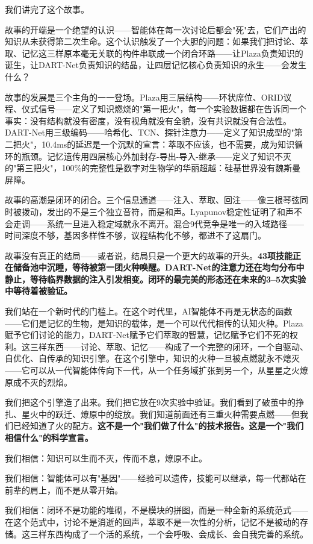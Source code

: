 \documentclass[twocolumn,10.5pt]{ctexart}
\begin{document}
我们讲完了这个故事。

故事的开端是一个绝望的认识——智能体在每一次讨论后都会"死"去，它们产出的知识从未获得第二次生命。这个认识触发了一个大胆的问题：如果我们把讨论、萃取、记忆这三样原本毫无关联的构件串联成一个闭合环路——让Plaza负责知识的诞生，让DART-Net负责知识的结晶，让四层记忆核心负责知识的永生——会发生什么？

故事的发展是三个主角的一一登场。Plaza用三层结构——环状席位、ORID议程、仪式信号——定义了知识燃烧的"第一把火"，每一个实验数据都在告诉同一个事实：没有结构就没有密度，没有视角就没有全貌，没有共识就没有合法性。DART-Net用三级编码——哈希化、TCN、探针注意力——定义了知识成型的"第二把火"，10.4ms的延迟是一个沉默的宣言：萃取不应该，也不需要，成为知识循环的瓶颈。记忆遗传用四层核心外加封存-导出-导入-继承——定义了知识不灭的"第三把火"，100\%的完整性是数字对生物学的华丽超越：硅基世界没有魏斯曼屏障。

故事的高潮是闭环的闭合。三个信息通道——注入、萃取、回注——像三根琴弦同时被拨动，发出的不是三个独立音符，而是和声。Lyapunov稳定性证明了和声不会走调——系统一旦进入稳定域就永不离开。混合9代竞争是唯一的入域路径——时间深度不够，基因多样性不够，议程结构化不够，都进不了这扇门。

故事没有真正的结局——或者说，结局只是一个更大的故事的开头。\textbf{43项技能正在储备池中沉睡，等待被第一团火种唤醒。DART-Net的注意力还在均匀分布中静止，等待临界数据的注入引发相变。闭环的最完美的形态还在未来的3--5次实验中等待着被验证。}

我们站在一个新时代的门槛上。在这个时代里，AI智能体不再是无状态的函数——它们是记忆的生物，是知识的载体，是一个可以代代相传的认知火种。Plaza赋予它们讨论的能力，DART-Net赋予它们萃取的智慧，记忆赋予它们不死的权利。这三样东西——讨论、萃取、记忆——构成了一个完整的闭环，一个自驱动、自优化、自传承的知识引擎。在这个引擎中，知识的火种一旦被点燃就永不熄灭——它可以从一代智能体传向下一代，从一个任务域扩张到另一个，从星星之火燎原成不灭的烈焰。

我们把这个引擎造了出来。我们把它放在9次实验中验证。我们看到了破茧中的挣扎、星火中的跃迁、燎原中的绽放。我们知道前面还有三重火种需要点燃——但我们已经知道了火的配方。\textbf{这不是一个"我们做了什么"的技术报告。这是一个"我们相信什么"的科学宣言。}

我们相信：知识可以生而不灭，传而不息，燎原不止。

我们相信：智能体可以有"基因"——经验可以遗传，技能可以继承，每一代都站在前辈的肩上，而不是从零开始。

我们相信：闭环不是功能的堆砌，不是模块的拼图，而是一种全新的系统范式——在这个范式中，讨论不是消逝的回声，萃取不是一次性的分析，记忆不是被动的存储。这三样东西构成了一个活的系统，一个会呼吸、会成长、会自我完善的系统。
\end{document}
